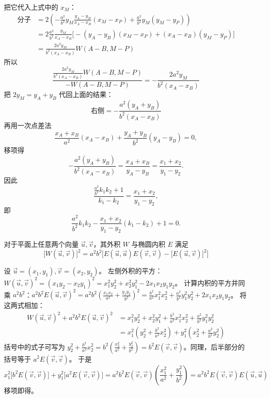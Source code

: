 把它代入上式中的 $x_M$：
\begin{align*}
\text{分子} &= 2 \left( {- \frac{a^2}{b^2} y_M \frac{y_A - y_B}{x_A - x_B}} (x_M - x_P) + \frac{a^2}{b^2} y_M (y_M - y_P) \right)\\
&=2 \frac{a^2}{b^2} \frac{y_M}{x_A - x_B} \Big[ -(y_A - y_B)(x_M - x_P) + (x_A - x_B)(y_M - y_P) \Big]\\
&= \frac{2a^2 y_M}{b^2 (x_A - x_B)} W(A-B, M-P)
\end{align*}
所以
$$\frac{ \frac{2a^2 y_M}{b^2 (x_A - x_B)} W(A-B, M-P) }{ -W(A-B, M-P) } = - \frac{2a^2 y_M}{b^2 (x_A - x_B)}$$
把 $2y_M = y_A + y_B$ 代回上面的结果：$$\text{右侧} = - \frac{a^2(y_A + y_B)}{b^2(x_A - x_B)}$$
再用一次点差法
\[
\frac{x_A + x_B}{a^2}(x_A - x_B) + \frac{y_A + y_B}{b^2}(y_A - y_B) = 0,
\]
移项得
\[
- \frac{a^2(y_A + y_B)}{b^2(x_A - x_B)} = \frac{x_A + x_B}{y_A - y_B} = \frac{x_1 + x_2}{y_1 - y_2}.
\]
因此
\[
\frac{\frac{a^2}{b^2} k_1 k_2 + 1}{k_1 - k_2} = \frac{x_1 + x_2}{y_1 - y_2},
\]
即
\[
\frac{a^2}{b^2} k_1 k_2 - \frac{x_1 + x_2}{y_1 - y_2}(k_1 - k_2) + 1 = 0.
\]

\begin{conclusion}[拉格朗日恒等式]
对于平面上任意两个向量 $\vec{u}, \vec{v}$，其外积 $W$ 与椭圆内积 $E$ 满足
$$ \big[W(\vec{u},\vec{v})\big]^2 = a^2 b^2 \Big[ E(\vec{u},\vec{u})E(\vec{v},\vec{v}) - \big[E(\vec{u},\vec{v})\big]^2 \Big] $$
\end{conclusion}
设 $\vec{u}=(x_1, y_1), \vec{v}=(x_2, y_2)$。
左侧外积的平方：$W(\vec{u},\vec{v})^2 = (x_1 y_2 - x_2 y_1)^2 = x_1^2 y_2^2 + x_2^2 y_1^2 - 2x_1 x_2 y_1 y_2$。
计算内积的平方并同乘 $a^2b^2$：$a^2b^2 E(\vec{u},\vec{v})^2 = a^2b^2 \left(\frac{x_1 x_2}{a^2} + \frac{y_1 y_2}{b^2}\right)^2 = \frac{b^2}{a^2}x_1^2 x_2^2 + \frac{a^2}{b^2}y_1^2 y_2^2 + 2x_1 x_2 y_1 y_2$。
将这两式相加：
\begin{align*}
W(\vec{u},\vec{v})^2 + a^2b^2 E(\vec{u},\vec{v})^2 &= x_1^2 y_2^2 + x_2^2 y_1^2 + \frac{b^2}{a^2}x_1^2 x_2^2 + \frac{a^2}{b^2}y_1^2 y_2^2 \\
&= x_1^2 \left( y_2^2 + \frac{b^2}{a^2}x_2^2 \right) + y_1^2 \left( x_2^2 + \frac{a^2}{b^2}y_2^2 \right)
\end{align*}
括号中的式子可写为
$y_2^2 + \frac{b^2}{a^2}x_2^2 = b^2 \left( \frac{x_2^2}{a^2} + \frac{y_2^2}{b^2} \right) = b^2 E(\vec{v},\vec{v})$。同理，后半部分的括号等于 $a^2 E(\vec{v},\vec{v})$。
于是
$$ x_1^2 \big[b^2 E(\vec{v},\vec{v})\big] + y_1^2 \big[a^2 E(\vec{v},\vec{v})\big] = a^2 b^2 E(\vec{v},\vec{v}) \left(\frac{x_1^2}{a^2} + \frac{y_1^2}{b^2}\right) = a^2 b^2 E(\vec{v},\vec{v}) E(\vec{u},\vec{u}) $$
移项即得。

